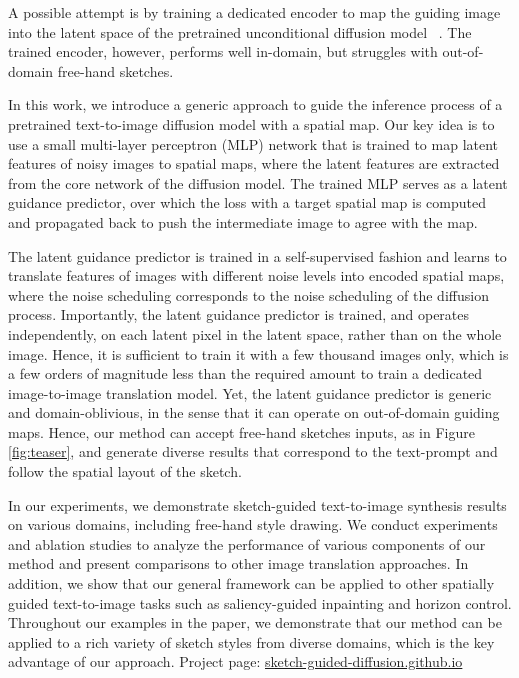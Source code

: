 A possible attempt is by training a dedicated encoder to map the guiding image into the latent space of the pretrained unconditional diffusion model ~\cite{PITI22}. The trained encoder, however, performs well in-domain, but struggles with out-of-domain free-hand sketches.

In this work, we introduce a generic approach to guide the inference process of a pretrained text-to-image diffusion model with a spatial map. Our key idea is to use a small multi-layer perceptron (MLP) network that is trained to map latent features of noisy images to spatial maps, where the latent features are extracted from the core network of the diffusion model. The trained MLP serves as a latent guidance predictor, over which the loss with a target spatial map is computed and propagated back to push the intermediate image to agree with the map.

The latent guidance predictor is trained in a self-supervised fashion and learns to translate features of images with different noise levels into encoded spatial maps, where the noise scheduling corresponds to the noise scheduling of the diffusion process. Importantly, the latent guidance predictor is trained, and operates independently, on each latent pixel in the latent space, rather than on the whole image. Hence, it is sufficient to train it with a few thousand images only, which is a few orders of magnitude less than the required amount to train a dedicated image-to-image translation model. Yet, the latent guidance predictor is generic and domain-oblivious, in the sense that it can operate on out-of-domain guiding maps. Hence, our method can accept free-hand sketches inputs, as in Figure \ref{fig:teaser}, and generate diverse results that correspond to the text-prompt and follow the spatial layout of the sketch.

In our experiments, we demonstrate sketch-guided text-to-image synthesis results on various domains, including free-hand style drawing. We conduct experiments and ablation studies to analyze the performance of various components of our method and present comparisons to other image translation approaches. In addition, we show that our general framework can be applied to other spatially guided text-to-image tasks such as saliency-guided inpainting and horizon control. Throughout our examples in the paper, we demonstrate that our method can be applied to a rich variety of sketch styles from diverse domains, which is the key advantage of our approach. Project page: \url{sketch-guided-diffusion.github.io}

